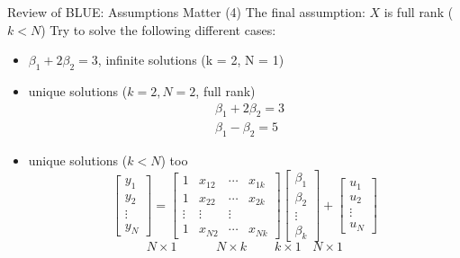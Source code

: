 \documentclass[aspectratio=169, t]{beamer}
\begin{document}
\begin{frame}{Review of BLUE: Assumptions Matter (4)}
    The final assumption: $X$ is full rank ($k < N$)
    Try to solve the following different cases:
    \begin{itemize}
        \item $\beta_1 + 2\beta_2 = 3$, infinite solutions (k = 2, N = 1)
        \item unique solutions ($k = 2, N = 2$, full rank) 
        \begin{align*}
            & \beta_1 + 2 \beta_2 = 3 \\
            & \beta_1 - \beta_2 = 5
        \end{align*}
        \item unique solutions ($k < N$) too 
        \begin{equation*}
            \begin{bmatrix}
                y_1 \\
                y_2 \\
                \vdots \\
                y_N
            \end{bmatrix} = \begin{bmatrix}
                1 & x_{12} & \cdots & x_{1k} \\
                1 & x_{22} & \cdots & x_{2k} \\
                \vdots & \vdots & \vdots \\
                1 & x_{N2} & \cdots & x_{Nk} 
            \end{bmatrix} \begin{bmatrix}
                \beta_1 \\ 
                \beta_2 \\
                \vdots \\
                \beta_k
            \end{bmatrix} + \begin{bmatrix}
                u_1 \\
                u_2 \\
                \vdots  \\ 
                u_N
            \end{bmatrix}
        \end{equation*}
        \begin{equation*}
            N \times 1 \ \ \ \ \ \ \ \ \ \ \ \ \ \ N \times k \ \ \ \  \ \ \ \ \ \ k \times 1 \ \ \ \ N \times 1 
        \end{equation*}
    \end{itemize}
\end{frame}
\end{document}
